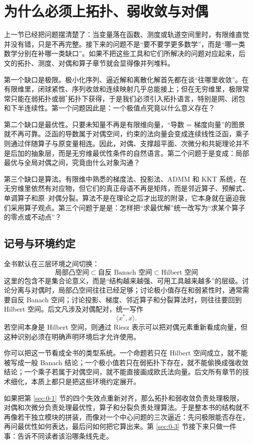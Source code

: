 \section{为什么必须上拓扑、弱收敛与对偶}

\label{sec:0-2}

上一节已经把问题摆清楚了：当变量落在函数、测度或轨道空间里时，有限维直觉并没有错，只是不再完整。接下来的问题不是“要不要学更多数学”，而是“哪一类数学分别在补哪一类缺口”。如果不把这些工具和它们所解决的问题对应起来，后文的拓扑、测度、对偶和算子章节就会显得像并列堆料。

第一个缺口是极限。极小化序列、逼近解和离散化解首先都在谈“往哪里收敛”。在有限维里，闭球紧性、序列收敛和连续映射几乎总能接上；但在无穷维里，极限常常只能在弱拓扑或弱$^\ast$拓扑下获得，于是我们必须引入拓扑语言，特别是网、闭包和下半连续性。第一个问题因此是：一个极值点究竟以什么意义存在？

第二个缺口是最优性。只要未知量不再是有限维向量，“导数 = 梯度向量”的图景就不再可靠。泛函的导数属于对偶空间，约束的法向量会变成连续线性泛函，乘子则通过伴随算子与原变量相连。因此，对偶、支撑超平面、次微分和共轭理论并不是后加的抽象层，而是无穷维最优性条件的自然语言。第二个问题于是变成：局部最优与全局对偶之间，究竟由什么对象沟通？

第三个缺口是算法。有限维中熟悉的梯度法、投影法、ADMM 和 KKT 系统，在无穷维里依然有对应物，但它们的真正母语不再是矩阵，而是邻近算子、预解式、单调算子和原--对偶分裂。算法不是在理论之后才出现的附录，它本身就在逼迫我们采用算子观点。第三个问题于是是：怎样把“求最优解”统一改写为“求某个算子的零点或不动点”？

\subsection*{记号与环境约定}

全书默认在三层环境之间切换：
\[
\text{局部凸空间} \subset \text{自反 Banach 空间} \subset \text{Hilbert 空间}
\]
这里的包含不是集合论意义，而是“结构越来越强、可用工具越来越多”的层级。讨论分离与对偶时，局部凸空间往往已经足够；讨论极小值存在和弱紧性时，通常需要自反 Banach 空间；讨论投影、梯度、邻近算子和分裂算法时，则往往要回到 Hilbert 空间。后文凡涉及对偶配对，统一写作
\[
\langle x^\ast,x\rangle.
\]
若空间本身是 Hilbert 空间，则通过 Riesz 表示可以把对偶元素重新看成向量，但这种识别必须在明确声明环境后才允许使用。

\begin{remark}
你可以把这一节看成全书的类型系统。一个命题若只在 Hilbert 空间成立，就不能被写成一般 Banach 结论；一个极小值若只在弱拓扑下存在，就不能偷换成强收敛结论；一个乘子若属于对偶空间，就不能直接画成欧氏法向量。后文所有章节的技术细化，本质上都只是把这些环境约定展开。
\end{remark}

如果把第 \ref{sec:0-1} 节的四个失效点重新对齐，那么拓扑和弱收敛负责处理极限，对偶和次微分负责处理最优性，算子和分裂负责处理算法。于是整本书的结构就不再像若干独立模块的拼装，而像对一个中心问题的三次逼近：先问极限能否存在，再问最优性如何表达，最后问如何把它算出来。第 \ref{sec:0-3} 节接下来只做一件事：告诉不同读者该沿哪条线先走。
